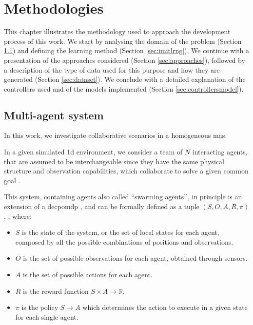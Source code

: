 \chapter{Methodologies}
\label{chap:methods}

This chapter illustrates the methodology used to approach the development 
process of this work. 
We start by analysing the domain of the problem (Section \ref{sec:MAS}) and 
defining the learning method (Section \ref{sec:imitlrng}), 
We continue with a presentation of the approaches considered (Section 
\ref{sec:approaches}), followed by  a description of the type of data used for this 
purpose and how they are generated (Section \ref{sec:dataset}).
We conclude with a detailed explanation of the controllers used and of the models
implemented (Section \ref{sec:controllersmodel}). 


\section{Multi-agent system}
\label{sec:MAS}

In this work, we investigate collaborative scenarios in a homogeneous \gls{mas}.

In a given simulated \gls{1d} environment, we consider a team of $N$ interacting 
agents, that are assumed to be interchangeable since they have the same physical 
structure and observation capabilities, which collaborate to solve a given common 
goal \cite[][]{stone2000multiagent, vsovsic2016inverse}.

This system, containing agents also called ``swarming agents’’, in principle is an 
extension of a \gls{decpomdp} \cite[][]{oliehoek2012decentralised}, and can be 
formally defined as a tuple $(S, O, A, R, \pi)$, \cite[see][]{schaal1999imitation}, 
where:
\begin{itemize}
	\item $S$ is the state of the system, or the set of local states for each agent, 
	composed by all the possible combinations of positions and observations.
	\item $O$ is the set of possible observations for each agent, obtained through 
	sensors.
	\item $A$ is the set of possible actions for each agent.
	\item $R$ is the reward function $S \times A \rightarrow \mathbb{R}$.
	\item $\pi$ is the policy $S \rightarrow A$ which determines the action to 
	execute in a given state for each single agent.
\end{itemize}

